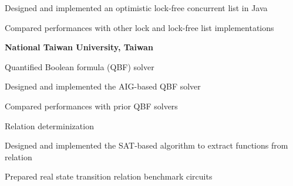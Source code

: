 \begin{myexp}
\begin{myexp}
\begin{mybullet}
            \item Designed and implemented an optimistic lock-free concurrent list in Java
            \item Compared performances with other lock and lock-free list implementations
        \end{mybullet}
\end{myexp}
\item \textbf{National Taiwan University, Taiwan}   
    \begin{myexp}
    \item Quantified Boolean formula (QBF) solver 
        \begin{mybullet}
            \item Designed and implemented the AIG-based QBF solver
            \item Compared performances with prior QBF solvers
        \end{mybullet}
    \item Relation determinization 
        \begin{mybullet}
            \item Designed and implemented the SAT-based algorithm to extract functions from relation
            \item Prepared real state transition relation benchmark circuits

\end{mybullet}
\end{myexp}
\end{myexp}

